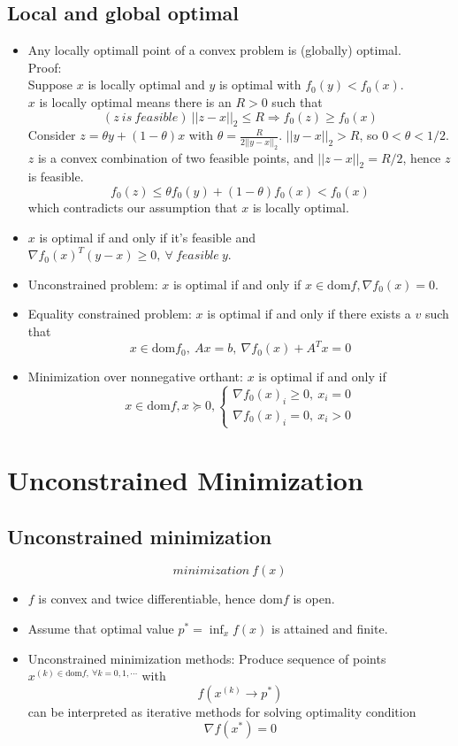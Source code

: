 \subsection{Local and global optimal}
\begin{itemize}
    \item Any locally optimall point of a convex problem is (globally) optimal. \\
    Proof: \\
    Suppose $x$ is locally optimal and $y$ is optimal with $f_0(y) < f_0(x)$. \\
    $x$ is locally optimal means there is an $R > 0$ such that
    $$
    (z \ is \ feasible) \ ||z - x||_2 \le R \Rightarrow f_0(z) \ge f_0(x)
    $$
    Consider $z = \theta y + (1 - \theta)x$ with $\theta = \frac{R}{2||y - x||_2}$. $||y - x||_2 > R$, so $0 < \theta < 1/2$. \\
    $z$ is a convex combination of two feasible points, and $||z - x||_2 = R/2$, hence $z$ is feasible.
    $$
    f_0(z) \le \theta f_0(y) + (1 - \theta)f_0(x) < f_0(x)
    $$
    which contradicts our assumption that $x$ is locally optimal.
    \item $x$ is optimal if and only if it's feasible and $\nabla f_0(x)^T(y - x) \ge 0, \  \forall \ feasible \ y$.
    \item Unconstrained problem: $x$ is optimal if and only if $x \in \text{dom} f, \nabla f_0(x) = 0$.
    \item Equality constrained problem: $x$ is optimal if and only if there exists a $v$ such that
    $$
    x \in \text{dom} f_0, \ Ax = b, \ \nabla f_0(x) + A^Tx = 0
    $$
    \item Minimization over nonnegative orthant: $x$ is optimal if and only if
    $$
    x \in \text{dom} f, x \succcurlyeq 0, 
    \begin{cases}
        \nabla f_0(x)_i \ge 0, \ x_i = 0 \\
        \nabla f_0(x)_i = 0, \ x_i > 0
    \end{cases}
    $$
\end{itemize}
\pagebreak

\section{Unconstrained Minimization}
\subsection{Unconstrained minimization}
$$
minimization \ f(x)
$$
\begin{itemize}
    \item $f$ is convex and twice differentiable, hence $\text{dom} f$ is open.
    \item Assume that optimal value $p^* = \inf_x f(x)$ is attained and finite.
    \item Unconstrained minimization methods: Produce sequence of points $x^{(k) \in \text{dom} f, \ \forall k = 0, 1, \cdots}$ with
    $$
    f(x^{(k)} \rightarrow p^*)
    $$
    can be interpreted as iterative methods for solving optimality condition
    $$
    \nabla f(x^*) = 0
    $$
\end{itemize}

